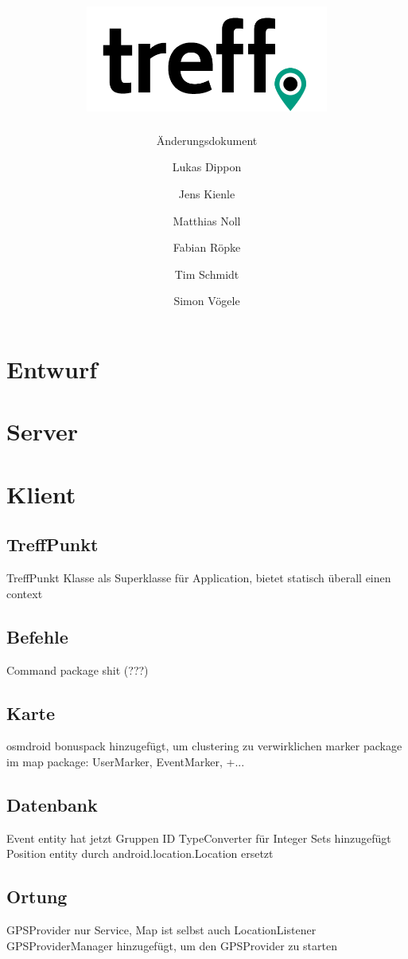\documentclass[parskip=full,11pt]{scrartcl}
\title{\includegraphics[width = 80mm]{images/logo_crop.png}}
\subtitle{\huge Änderungsdokument}
\author{Lukas Dippon
        \and Jens Kienle
        \and Matthias Noll
        \and Fabian Röpke
        \and Tim Schmidt
        \and Simon Vögele}
\begin{document}
\maketitle
\thispagestyle{empty} %

\pagebreak
\tableofcontents

\pagebreak
\section{Entwurf}



\pagebreak
\section{Server}



\pagebreak
\section{Klient}

\subsection{TreffPunkt}
TreffPunkt Klasse als Superklasse für Application, bietet statisch überall einen context

\subsection{Befehle}
Command package shit (???)

\subsection{Karte}
osmdroid bonuspack hinzugefügt, um clustering zu verwirklichen
marker package im map package: UserMarker, EventMarker, +...

\subsection{Datenbank}
Event entity hat jetzt Gruppen ID
TypeConverter für Integer Sets hinzugefügt
Position entity durch android.location.Location ersetzt

\subsection{Ortung}
GPSProvider nur Service, Map ist selbst auch LocationListener
GPSProviderManager hinzugefügt, um den GPSProvider zu starten
\end{document}
